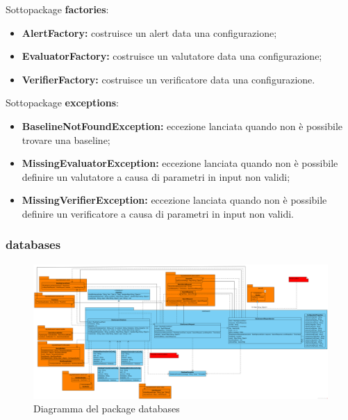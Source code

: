 			Sottopackage \textbf{factories}:\\
			\begin{itemize}
				\item \textbf{AlertFactory:} costruisce un alert data una configurazione;
				\item \textbf{EvaluatorFactory:} costruisce un valutatore data una configurazione;
				\item \textbf{VerifierFactory:} costruisce un verificatore data una configurazione.
			\end{itemize}
			
			Sottopackage \textbf{exceptions}:
			\begin{itemize}
				\item \textbf{BaselineNotFoundException:} eccezione lanciata quando non è possibile trovare 
					una baseline;
				\item \textbf{MissingEvaluatorException:} eccezione lanciata quando non è possibile definire 
					un valutatore a causa di parametri in input non validi;
				\item \textbf{MissingVerifierException:} eccezione lanciata quando non è possibile definire 
					un verificatore a causa di parametri in input non validi.
			\end{itemize}

\newpage
			
	\subsubsection{databases}


		\begin{figure}[H]
            	\centering
        	    \includegraphics[width=\textwidth]{./img/DiagrammiClasse/databases.png}
        	    \caption[Diagramma del package databases]{Diagramma del package databases}
       	\end{figure}\\
		
